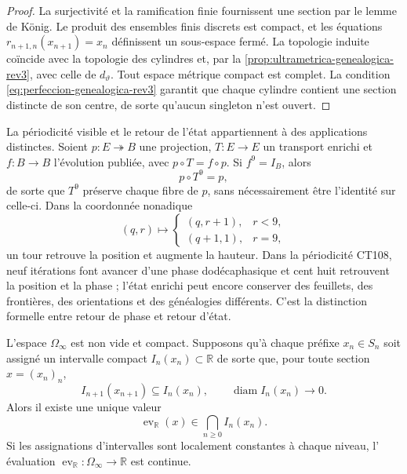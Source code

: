 \begin{proof}
La surjectivité et la ramification finie fournissent une section par le
lemme de König. Le produit des ensembles finis discrets est compact, et
les équations \(r_{n+1,n}(x_{n+1})=x_n\) définissent un sous-espace fermé. La
topologie induite coïncide avec la topologie des cylindres et, par la
\cref{prop:ultrametrica-genealogica-rev3}, avec celle de
\(d_\vartheta\). Tout espace métrique compact est complet. La condition
\eqref{eq:perfeccion-genealogica-rev3} garantit que chaque cylindre contient
une section distincte de son centre, de sorte qu'aucun singleton n'est ouvert.
\end{proof}

La périodicité visible et le retour de l'état appartiennent à des applications
distinctes. Soient \(p:E\twoheadrightarrow B\) une projection, \(T:E\to E\) un
transport enrichi et \(f:B\to B\) l'évolution publiée, avec
\(p\circ T=f\circ p\). Si \(f^9=I_B\), alors
\begin{equation}
 p\circ T^9=p,
 \label{eq:retorno-visible-fibra-rev3}
\end{equation}
de sorte que \(T^9\) préserve chaque fibre de \(p\), sans nécessairement être
l'identité sur celle-ci. Dans la coordonnée nonadique
\[
 (q,r)\longmapsto
 \begin{cases}
  (q,r+1),&r<9,\\
  (q+1,1),&r=9,
 \end{cases}
\]
un tour retrouve la position et augmente la hauteur. Dans la périodicité
CT108, neuf itérations font avancer d'une phase dodécaphasique et cent huit
retrouvent la position et la phase ; l'état enrichi peut encore conserver
des feuillets, des frontières, des orientations et des généalogies différents. C'est la distinction
formelle entre retour de phase et retour d'état.

\begin{theorem}
\label{thm:reconstruccion-continuo-secciones-rev2}
L'espace \(\Omega_\infty\) est non vide et compact. Supposons qu'à chaque
préfixe \(x_n\in S_n\) soit assigné un intervalle compact
\(I_n(x_n)\subset\mathbb R\) de sorte que, pour toute section
\(x=(x_n)_n\),
\[
 I_{n+1}(x_{n+1})\subseteq I_n(x_n),
 \qquad
 \operatorname{diam}I_n(x_n)\longrightarrow0.
\]
Alors il existe une unique valeur
\begin{equation}
 \operatorname{ev}_{\mathbb R}(x)
 \in\bigcap_{n\geq0}I_n(x_n).
 \label{eq:evaluacion-seccion-continua-rev2}
\end{equation}
Si les assignations d'intervalles sont localement constantes à chaque niveau, l'
évaluation \(\operatorname{ev}_{\mathbb R}:\Omega_\infty\to\mathbb R\) est
continue.
\end{theorem}

